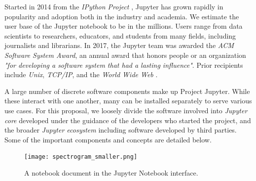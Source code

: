 Started in 2014 from the \emph{IPython Project} \cite{IPython}, Jupyter has grown rapidly in
popularity and adoption both in the industry and academia. We estimate the user
base of the Jupyter notebook to be in the millions. Users range from data
scientists to researchers, educators, and students from many fields,
including journalists and librarians. In 2017, the Jupyter
team was awarded the \emph{ACM Software System Award}, an annual award that
honors people or an organization \emph{"for developing a software system that had a
lasting influence"}. Prior recipients include \emph{Unix}, \emph{TCP/IP}, and
the \emph{World Wide Web} \cite{acm-award}.

A large number of discrete software components make up Project Jupyter.
While these interact with one another, many can be installed separately
to serve various use cases. For this proposal, we loosely divide the
software involved into \emph{Jupyter core} developed under the guidance
of the developers who started the project, and the broader \emph{Jupyter
ecosystem} including software developed by third parties. Some of the
important components and concepts are detailed below.

\begin{figure}[ht]\centering
  \centering
  \texttt{[image: spectrogram\_smaller.png]}
  \caption{A notebook document in the Jupyter Notebook interface.}\label{fig:notebook-screenshot}
\end{figure}

